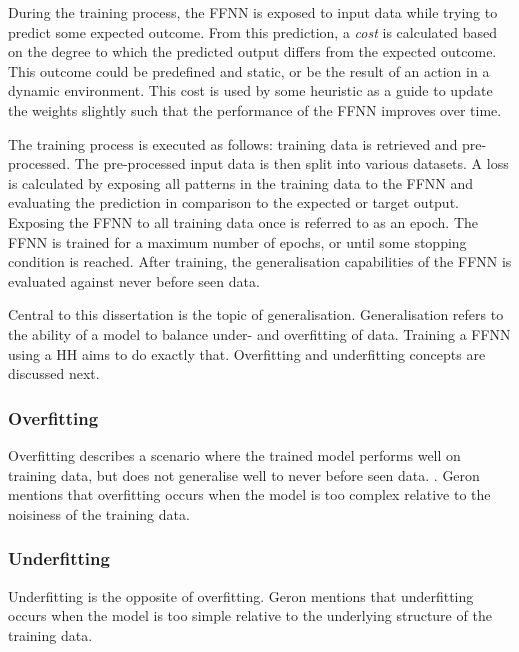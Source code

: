 During the training process, the \ac{FFNN} is exposed to input data while
trying to predict some expected outcome. From this prediction, a \textit{cost}
is calculated based on the degree to which the predicted output differs from the
expected outcome. This outcome could be predefined and static, or be the result
of an action in a dynamic environment. This cost is used by some
heuristic as a guide to update the weights slightly such that
the performance of the \ac{FFNN} improves over time.

The training process is executed as follows: training data is retrieved and
pre-processed. The pre-processed input data is then split into various datasets.
A loss is calculated by exposing all patterns in the training data to the
\ac{FFNN} and evaluating the  prediction in comparison to the expected or target
output. Exposing the \ac{FFNN} to all training data once is referred to as an
epoch. The \ac{FFNN} is trained for a maximum number of epochs, or until some
stopping condition is reached. After training, the generalisation capabilities
of the \ac{FFNN} is evaluated against never before seen data.

Central to this dissertation is the topic of generalisation. Generalisation refers to
the ability of a model to balance under- and overfitting of data. Training a
\ac{FFNN} using a \ac{HH} aims to do exactly that. Overfitting and underfitting
concepts are discussed next.

\subsubsection{Overfitting}
\label{sec:anns:training:overfitting}

Overfitting describes a scenario where the trained model
performs well on training data, but does not generalise well to never before
seen data. \cite{ref:tetko:1995, ref:geron:2017}. Geron \cite{ref:geron:2017}
mentions that overfitting occurs when the model is too
complex relative to the noisiness of the training data.


\subsubsection{Underfitting}
\label{sec:anns:training:generalisation_capabilities:underfitting}

Underfitting is the opposite of
overfitting. Geron \cite{ref:geron:2017} mentions that
underfitting occurs when the model is too simple relative to
the underlying structure of the training data.


